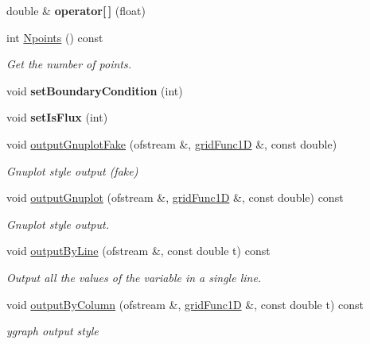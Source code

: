 \begin{DoxyCompactItemize}
\item 
\mbox{\label{classgridFunc1D_a5c270cddc809aa94b3dfce3588b8aacd}} 
double \& {\bfseries operator\mbox{[}$\,$\mbox{]}} (float)
\item 
\mbox{\label{classgridFunc1D_a71aaccb7ea0b40b0360afdf398d07fa0}} 
int \hyperlink{classgridFunc1D_a71aaccb7ea0b40b0360afdf398d07fa0}{Npoints} () const
\begin{DoxyCompactList}\small\item\em Get the number of points. \end{DoxyCompactList}\item 
\mbox{\label{classgridFunc1D_a83347f8764f77eef88ef326ef71d96b3}} 
void {\bfseries set\+Boundary\+Condition} (int)
\item 
\mbox{\label{classgridFunc1D_aba748038bbce60927dd328ebe5f712ac}} 
void {\bfseries set\+Is\+Flux} (int)
\item 
void \hyperlink{classgridFunc1D_a5dc63c77c8be317834291dcd0d66079d}{output\+Gnuplot\+Fake} (ofstream \&, \hyperlink{classgridFunc1D}{grid\+Func1D} \&, const double)
\begin{DoxyCompactList}\small\item\em Gnuplot style output (fake) \end{DoxyCompactList}\item 
void \hyperlink{classgridFunc1D_aeb63f2e7e15429025c33aa24abf288ad}{output\+Gnuplot} (ofstream \&, \hyperlink{classgridFunc1D}{grid\+Func1D} \&, const double) const
\begin{DoxyCompactList}\small\item\em Gnuplot style output. \end{DoxyCompactList}\item 
void \hyperlink{classgridFunc1D_a07793d54b659a46c6a38c3fe0b70f6c2}{output\+By\+Line} (ofstream \&, const double t) const
\begin{DoxyCompactList}\small\item\em Output all the values of the variable in a single line. \end{DoxyCompactList}\item 
void \hyperlink{classgridFunc1D_a9843d7697659ce644eb46c127f9c57cb}{output\+By\+Column} (ofstream \&, \hyperlink{classgridFunc1D}{grid\+Func1D} \&, const double t) const
\begin{DoxyCompactList}\small\item\em ygraph output style \end{DoxyCompactList}\item 

\end{DoxyCompactItemize}
